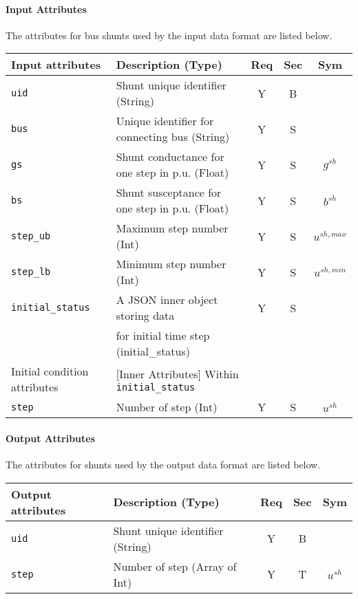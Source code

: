 \documentclass{article}
\begin{document}
\paragraph{Input Attributes} The attributes for bus shunts used by the input data format are listed below.
\begin{center}
\small

\begin{tabular}{ l | l | c | c | c | }
Input attributes & Description (Type) & Req & Sec & Sym\\
\hline
  {\tt uid} & Shunt unique identifier (String) & Y & B &  \\
  {\tt bus} & Unique identifier for connecting bus (String) & Y & S &  \\   
  {\tt gs}  & Shunt conductance for one step in p.u. (Float) & Y & S & $g^{sh}$ \\  
  {\tt bs}  & Shunt susceptance for one step in p.u. (Float) & Y & S & $b^{sh}$ \\
  {\tt step\_ub}      & Maximum step number (Int)  & Y & S & $u^{sh,max}$\\
  {\tt step\_lb}      & Minimum step number (Int)  & Y & S & $u^{sh,min}$\\
  {\tt initial\_status} & A JSON inner object storing data  & Y & S &  \\
       & for initial time step (initial\_status) &  &  &  \\
  \hline
  Initial condition attributes & [Inner Attributes] Within {\tt initial\_status} & & & \\
  \hline
  {\tt step}       & Number of step (Int)  & Y  & S &$u^{sh}$\\  
\hline
\end{tabular}
\end{center}

\paragraph{Output Attributes} The attributes for shunts used by the output data format are listed below.

\begin{center}
\small
\begin{tabular}{ l | l | c | c | c |}
Output attributes & Description (Type) & Req & Sec & Sym\\
\hline
  {\tt uid} & Shunt unique identifier (String) & Y & B & \\
  {\tt step}      & Number of step (Array of Int)  & Y  & T &$u^{sh}$\\
\hline
\end{tabular}
\end{center}
\end{document}
